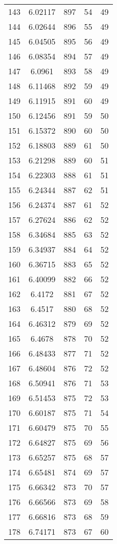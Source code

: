 \documentclass[12pt,a4paper]{article}
\begin{document}
\begin{tabular}{r|cccc}
	143 & 6.02117 & 897 & 54 & 49 \\
	144 & 6.02644 & 896 & 55 & 49 \\
	145 & 6.04505 & 895 & 56 & 49 \\
	146 & 6.08354 & 894 & 57 & 49 \\
	147 & 6.0961 & 893 & 58 & 49 \\
	148 & 6.11468 & 892 & 59 & 49 \\
	149 & 6.11915 & 891 & 60 & 49 \\
	150 & 6.12456 & 891 & 59 & 50 \\
	151 & 6.15372 & 890 & 60 & 50 \\
	152 & 6.18803 & 889 & 61 & 50 \\
	153 & 6.21298 & 889 & 60 & 51 \\
	154 & 6.22303 & 888 & 61 & 51 \\
	155 & 6.24344 & 887 & 62 & 51 \\
	156 & 6.24374 & 887 & 61 & 52 \\
	157 & 6.27624 & 886 & 62 & 52 \\
	158 & 6.34684 & 885 & 63 & 52 \\
	159 & 6.34937 & 884 & 64 & 52 \\
	160 & 6.36715 & 883 & 65 & 52 \\
	161 & 6.40099 & 882 & 66 & 52 \\
	162 & 6.4172 & 881 & 67 & 52 \\
	163 & 6.4517 & 880 & 68 & 52 \\
	164 & 6.46312 & 879 & 69 & 52 \\
	165 & 6.4678 & 878 & 70 & 52 \\
	166 & 6.48433 & 877 & 71 & 52 \\
	167 & 6.48604 & 876 & 72 & 52 \\
	168 & 6.50941 & 876 & 71 & 53 \\
	169 & 6.51453 & 875 & 72 & 53 \\
	170 & 6.60187 & 875 & 71 & 54 \\
	171 & 6.60479 & 875 & 70 & 55 \\
	172 & 6.64827 & 875 & 69 & 56 \\
	173 & 6.65257 & 875 & 68 & 57 \\
	174 & 6.65481 & 874 & 69 & 57 \\
	175 & 6.66342 & 873 & 70 & 57 \\
	176 & 6.66566 & 873 & 69 & 58 \\
	177 & 6.66816 & 873 & 68 & 59 \\
	178 & 6.74171 & 873 & 67 & 60 \\

\end{tabular}
\end{document}
